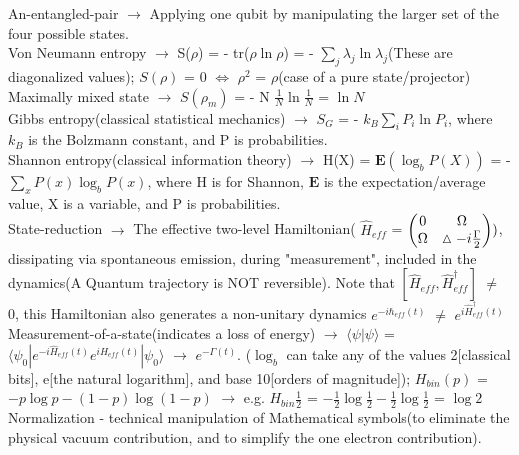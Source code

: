 \documentclass[10pt,fancy]{elegantbook}
\begin{document}
{\begin{definition}
  
An-entangled-pair $\longrightarrow$ Applying one qubit by manipulating the larger set of the four possible states.  \\

Von Neumann entropy $\longrightarrow$ S($\rho$) = - tr($\rho \ln \rho$) = - $\sum_j \lambda_j \ln \lambda_j$(These are diagonalized values); $S(\rho)$ = 0 $\iff$ $\rho^2$ = $\rho$(case of a pure state/projector) \\
 
Maximally mixed state $\longrightarrow$ $S(\rho_m)$ = - N $\frac{1}{N} \ln \frac{1}{N}$ = $\ln N$  \\

Gibbs entropy(classical statistical mechanics) $\longrightarrow$ $S_G$ = - $k_B \sum_i {P_i \ln P_i}$, where $k_B$ is the Bolzmann constant, and P is probabilities. \\
  
Shannon entropy(classical information theory) $\longrightarrow$ H(X) = $\mathbf E(\log_b P(X))$ = - $\sum_x P(x) \log_b P(x)$, where H is for Shannon, $\mathbf E$ is the expectation/average value, X is a variable, and P is probabilities. \\
  
State-reduction $\longrightarrow$ The effective two-level Hamiltonian( $\hat H_{eff}$ = $\begin{pmatrix}0 & \Omega \cr \Omega & \vartriangle - i \frac{\Gamma}{2} \end{pmatrix} )$, dissipating via spontaneous emission, during "measurement", included in the dynamics(A Quantum trajectory is NOT reversible).
Note that $[\hat H_{eff}, \hat H^\dagger_{eff}]$ $\neq$ 0, this Hamiltonian also generates a non-unitary dynamics $e^{- i \hbar_{eff}(t)}$ $\neq$ $e^{i \hat H^\dagger_{eff}(t)}$  \\

Measurement-of-a-state(indicates a loss of energy) $\longrightarrow$ $\langle \psi | \psi \rangle$ = $\langle \psi_0 | e^{- i \hat H_{eff}(t)} e^{i \hat H_{eff}(t)} | \psi_0 \rangle$ $\rightarrow$ $e^{- \Gamma(t)}$.  
($\log_b$ can take any of the values 2[classical bits], e[the natural logarithm], and base 10[orders of magnitude]);  
$H_{bin}(p)$ = $ -p \log p - (1 - p) \log (1 - p)$ $\rightarrow$ e.g. $H_{bin}\frac{1}{2}$ = $ - \frac{1}{2} \log \frac{1}{2} - \frac{1}{2} \log \frac{1}{2}$ = $\log 2$  \\
 
Normalization - technical manipulation of Mathematical symbols(to
eliminate the physical vacuum contribution, and to simplify the one electron contribution).  \\
 

\end{definition}}
\end{document}
